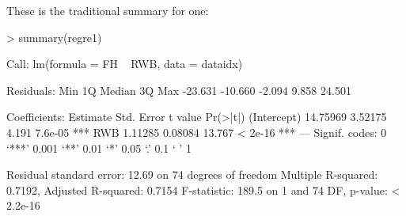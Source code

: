 \documentclass[11pt]{article}
\begin{document}
These is the traditional summary for one:
\begin{Schunk}
\begin{Sinput}
> summary(regre1)
\end{Sinput}
\begin{Soutput}
Call:
lm(formula = FH ~ RWB, data = dataidx)

Residuals:
    Min      1Q  Median      3Q     Max 
-23.631 -10.660  -2.094   9.858  24.501 

Coefficients:
            Estimate Std. Error t value Pr(>|t|)    
(Intercept) 14.75969    3.52175   4.191  7.6e-05 ***
RWB          1.11285    0.08084  13.767  < 2e-16 ***
---
Signif. codes:  0 ‘***’ 0.001 ‘**’ 0.01 ‘*’ 0.05 ‘.’ 0.1 ‘ ’ 1

Residual standard error: 12.69 on 74 degrees of freedom
Multiple R-squared:  0.7192,	Adjusted R-squared:  0.7154 
F-statistic: 189.5 on 1 and 74 DF,  p-value: < 2.2e-16
\end{Soutput}
\end{Schunk}
\end{document}
